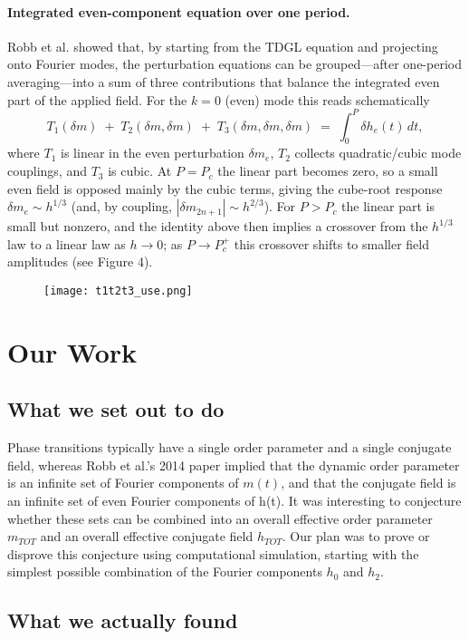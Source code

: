 \documentclass{article}
\begin{document}
\paragraph{Integrated even-component equation over one period.}
Robb et al. showed that, by starting from the TDGL equation and projecting onto Fourier modes, the perturbation equations can be grouped—after one-period averaging—into a sum of three contributions that balance the integrated even part of the applied field. For the $k=0$ (even) mode this reads schematically
\[
T_1(\delta m)\;+\;T_2(\delta m,\delta m)\;+\;T_3(\delta m,\delta m,\delta m)
\;=\;\int_0^{P}\!\delta h_e(t)\,dt,
\]
where $T_1$ is linear in the even perturbation $\delta m_e$, $T_2$ collects quadratic/cubic mode couplings, and $T_3$ is cubic. At $P=P_c$ the linear part becomes zero, so a small even field is opposed mainly by the cubic terms, giving the cube-root response $\delta m_e \sim h^{1/3}$ (and, by coupling, $|\delta m_{2n+1}| \sim h^{2/3}$). For $P>P_c$ the linear part is small but nonzero, and the identity above then implies a crossover from the $h^{1/3}$ law to a linear law as $h \to 0$; as $P \to P_c^{+}$ this crossover shifts to smaller field amplitudes (see Figure 4).
\begin{figure}[h]
    \centering
    \texttt{[image: t1t2t3\_use.png]}
    \caption{}
    \label{sklabel}
\end{figure}

\section{Our Work}

\subsection*{What we set out to do}
Phase transitions typically have a single order parameter and a single conjugate field, whereas Robb et al.’s 2014 paper implied that the dynamic order parameter is an infinite set of Fourier components of $m(t)$, and that the conjugate field is an infinite set of even Fourier components of h(t). It was interesting to conjecture whether these sets can be combined into an overall effective order parameter $m_{TOT}$ and an overall effective conjugate field $h_{TOT}$. Our plan was to prove or disprove this conjecture using computational simulation, starting with the simplest possible combination of the Fourier components $h_0$ and $h_2$.

\subsection*{What we actually found}
\end{document}
